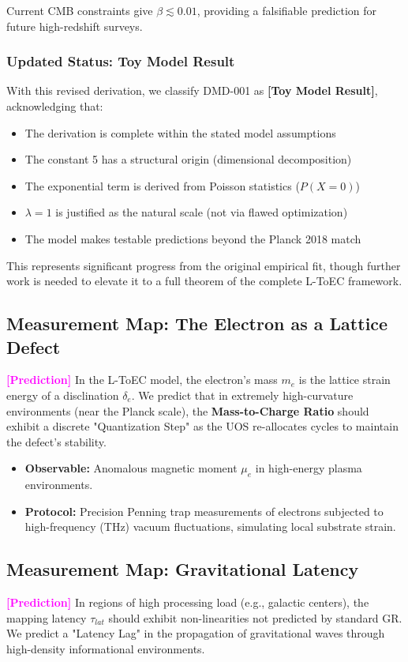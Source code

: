 \documentclass[11pt,titlepage]{article}
\newcommand{\tagpred}{\textcolor{magenta}{\textbf{[Prediction]}} }
\begin{document}
Current CMB constraints give $\beta \lesssim 0.01$, providing a falsifiable prediction for future high-redshift surveys.

\subsubsection{Updated Status: Toy Model Result}
With this revised derivation, we classify DMD-001 as \textbf{[Toy Model Result]}, acknowledging that:
\begin{itemize}
    \item The derivation is complete within the stated model assumptions
    \item The constant 5 has a structural origin (dimensional decomposition)
    \item The exponential term is derived from Poisson statistics ($P(X=0)$)
    \item $\lambda = 1$ is justified as the natural scale (not via flawed optimization)
    \item The model makes testable predictions beyond the Planck 2018 match
\end{itemize}

This represents significant progress from the original empirical fit, though further work is needed to elevate it to a full theorem of the complete L-ToEC framework.
\subsection{Measurement Map: The Electron as a Lattice Defect}
\tagpred In the L-ToEC model, the electron's mass $m_e$ is the lattice strain energy of a disclination $\delta_e$. We predict that in extremely high-curvature environments (near the Planck scale), the \textbf{Mass-to-Charge Ratio} should exhibit a discrete "Quantization Step" as the UOS re-allocates cycles to maintain the defect's stability.
\begin{itemize}
    
\item \textbf{Observable:} Anomalous magnetic moment $\mu_e$ in high-energy plasma environments.
    
\item \textbf{Protocol:} Precision Penning trap measurements of electrons subjected to high-frequency (THz) vacuum fluctuations, simulating local substrate strain.
\end{itemize}

\subsection{Measurement Map: Gravitational Latency}
\tagpred In regions of high processing load (e.g., galactic centers), the mapping latency $\tau_{lat}$ should exhibit non-linearities not predicted by standard GR. We predict a "Latency Lag" in the propagation of gravitational waves through high-density informational environments.
\end{document}
